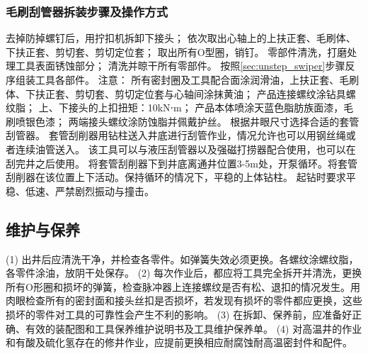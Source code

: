 \subsubsection{毛刷刮管器拆装步骤及操作方式}
\label{sec:unstep_swiper}
	去掉防掉螺钉后，用拧扣机拆卸下接头；
	依次取出心轴上的上扶正套、毛刷体、下扶正套、剪切套、剪切定位套；
	取出所有O型圈，销钉。
	零部件清洗，打磨处理工具表面锈蚀部分；
	清洗并晾干所有零部件。
按照\ref{sec:unstep_swiper}步骤反序组装工具各部件。
注意：
	所有密封圈及工具配合面涂润滑油，上扶正套、毛刷体、下扶正套、剪切套、剪切定位套与心轴间涂抹黄油；
	产品连接螺纹涂钻具螺纹脂；
	上、下接头的上扣扭矩：10kN⋅m；
	产品本体喷涂天蓝色脂肪族面漆，毛刷喷银色漆；
	两端接头螺纹涂防蚀脂并佩戴护丝。
	根据井眼尺寸选择合适的套管刮管器。
	套管刮削器用钻柱送入井底进行刮管作业，情况允许也可以用钢丝绳或者连续油管送入。
	该工具可以与液压刮管器以及强磁打捞器配合使用，也可以在刮完井之后使用。
	将套管刮削器下到井底离通井位置3-5m处，开泵循环。将套管刮削器在该位置上下活动。保持循环的情况下，平稳的上体钻柱。
	起钻时要求平稳、低速、严禁剧烈振动与撞击。


\subsection{维护与保养}

(1) 出井后应清洗干净，并检查各零件。如弹簧失效必须更换。各螺纹涂螺纹脂，各零件涂油，放阴干处保存。
(2) 每次作业后，都应将工具完全拆开并清洗，更换所有O形圈和损坏的弹簧，检查脉冲器上连接螺纹是否有松、退扣的情况发生。用肉眼检查所有的密封面和接头丝扣是否损坏，若发现有损坏的零件都应更换，这些损坏的零件对工具的可靠性会产生不利的影响。
(3) 在拆卸、保养前，应准备好正确、有效的装配图和工具保养维护说明书及工具维护保养单。
(4) 对高温井的作业和有酸及硫化氢存在的修井作业，应提前更换相应耐腐蚀耐高温密封件和配件。


















